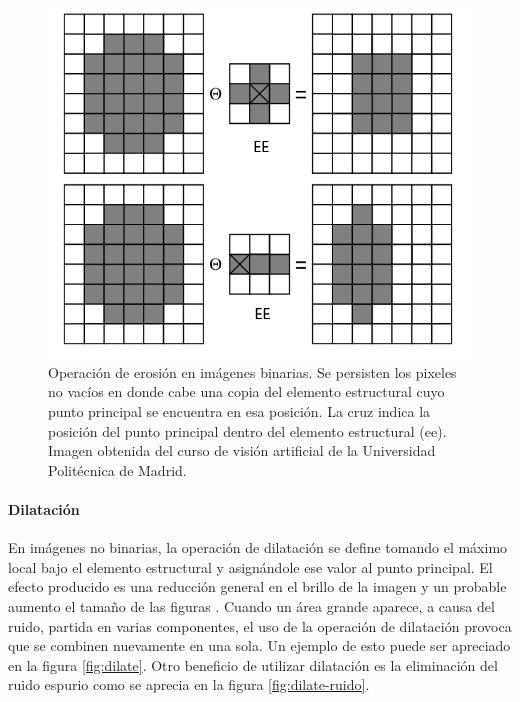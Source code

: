 \begin{figure}[tpb]
\begin{center}
  \includegraphics[scale=0.4]{vision/figures/erode-sample.png}
\end{center}
  \caption[Operaci\'on de erosi\'on]{\small Operaci\'on de erosi\'on en im\'agenes binarias. Se persisten los pixeles no vac\'ios en donde cabe una copia del elemento estructural cuyo punto principal se encuentra en esa posici\'on. La cruz indica la posici\'on del punto principal dentro del elemento estructural (ee). Imagen obtenida del curso de visi\'on artificial de la Universidad Polit\'ecnica de Madrid. } 
  \label{fig:erode-sample}
\end{figure}

	\paragraph{Dilataci\'on}
En im\'agenes no binarias, la operaci\'on de dilataci\'on se define 
tomando el m\'aximo local bajo el elemento estructural y asign\'andole ese valor al punto principal. El efecto producido es una reducci\'on general en el brillo de la imagen y un probable aumento el tama\~no de las figuras \cite{nasa-dilate-erode}.  Cuando un \'area grande aparece, a causa del ruido, partida en varias componentes, el uso de la operaci\'on de dilataci\'on provoca que  se combinen nuevamente en una sola. Un ejemplo de esto puede ser apreciado en la figura \ref{fig:dilate}. Otro beneficio de utilizar dilataci\'on es la eliminaci\'on del ruido espurio como se aprecia en la figura \ref{fig:dilate-ruido}.

